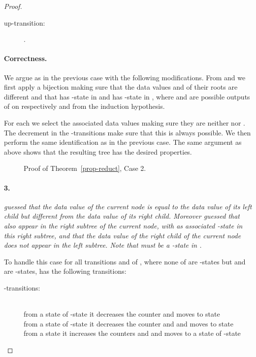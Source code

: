 \documentclass{CSML}
\begin{document}
\begin{proof}
\begin{description}
\item[\rm up-transition:]
.
\end{description}

\paragraph{\bf Correctness.}  We argue as in the previous case with the following modifications.
From  and  we first apply a bijection making sure that the
data values  and  of their roots are different and that  has
-state  in  
and  has -state  in ,
where  and 
 are possible outputs of  
on respectively  and  from the induction hypothesis.

For each  we select the associated data values making sure
they are neither  nor . The decrement in the -transitions make sure
that this is always possible. We then perform the same identification as in the
previous case. 
The same argument as above shows that the resulting tree  has the desired properties.

\begin{figure}
\small

\caption{Proof of Theorem~\ref{prop-reduct}, Case 2.}
\label{fig-reduct2}
\end{figure}







 
\paragraph{\bf 3.}  
\emph{ guessed that the data value  of the
  current node is equal to the data value of its left child but different
  from the data value of its right child.
  Moreover  guessed that  also appear in
  the right subtree of the current node, with  as associated -state in this right subtree, 
  and that the data value of the right child of the current node does not appear in the left subtree. 
  Note that  must be a -state in .}

\noindent
To handle this case for all transitions 
and  of
, where none of  are -states but
 and   are -states, 
 has the following transitions:
\begin{description}
\item[\rm -transitions:] \quad\\
from a state  of -state 
it decreases the counter  
and moves to state \\
from a state  of -state  
it decreases the counter  
and  and moves to state \\
from a state  
it increases the counters  and  
and moves to a state  of -state 


\end{description}
\end{proof}
\end{document}

